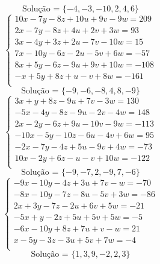 \documentclass[12pt,oneside,a4paper]{article}
\begin{document}
\begin{equation*}
\text{Solução = }\{-4,-3,-10,2,4,6\}
\end{equation*}
\vspace{\baselineskip}
\begin{equation*}
\begin{cases}
10x-7y-8z+10u+9v-9w=209 \\
2x-7y-8z+4u+2v+3w=93 \\
3x-4y+3z+2u-7v-10w=15 \\
7x-10y-6z-2u-5v+6w=-57 \\
8x+5y-6z-9u+9v+10w=-108 \\
-x+5y+8z+u-v+8w=-161 \\
\end{cases}
\end{equation*}
\begin{equation*}
\text{Solução = }\{-9,-6,-8,4,8,-9\}
\end{equation*}
\vspace{\baselineskip}
\begin{equation*}
\begin{cases}
3x+y+8z-9u+7v-3w=130 \\
-5x-4y-8z-9u-2v-4w=148 \\
2x-2y-6z+9u-10v-9w=-113 \\
-10x-5y-10z-6u-4v+6w=95 \\
-2x-7y-4z+5u-9v+4w=-73 \\
10x-2y+6z-u-v+10w=-122 \\
\end{cases}
\end{equation*}
\begin{equation*}
\text{Solução = }\{-9,-7,2,-9,7,-6\}
\end{equation*}
\vspace{\baselineskip}
\begin{equation*}
\begin{cases}
-9x-10y-4z+3u+7v-w=-70 \\
-8x-10y-7z-8u-5v+3w=-86 \\
2x+3y-7z-2u+6v+5w=-21 \\
-5x+y-2z+5u+5v+5w=-5 \\
-6x-10y+8z+7u+v-w=21 \\
x-5y-3z-3u+5v+7w=-4 \\
\end{cases}
\end{equation*}
\begin{equation*}
\text{Solução = }\{1,3,9,-2,2,3\}
\end{equation*}
\end{document}
